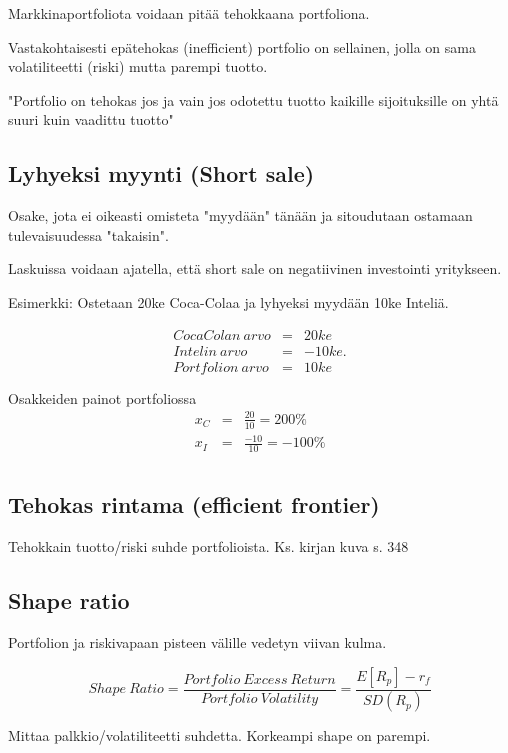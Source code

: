 \documentclass[a4paper]{article}
\begin{document}
Markkinaportfoliota voidaan pitää tehokkaana portfoliona.

Vastakohtaisesti epätehokas (inefficient) portfolio on sellainen, jolla on sama volatiliteetti (riski) mutta parempi tuotto.

"Portfolio on tehokas jos ja vain jos odotettu tuotto kaikille sijoituksille on yhtä suuri kuin vaadittu tuotto"

\subsection{Lyhyeksi myynti (Short sale)}

Osake, jota ei oikeasti omisteta "myydään" tänään ja sitoudutaan ostamaan tulevaisuudessa "takaisin".

Laskuissa voidaan ajatella, että short sale on negatiivinen investointi yritykseen.

Esimerkki: Ostetaan 20ke Coca-Colaa ja lyhyeksi myydään 10ke Inteliä. 

\[
\begin{array}{lcl}
    CocaColan\ arvo & = & 20ke \\
    Intelin\ arvo & = & -10ke. \\
    Portfolion\ arvo & = & 10ke
\end{array}
\]

Osakkeiden painot portfoliossa
\[
\begin{array}{lcl}
    x_C & = & \frac{20}{10} = 200\% \\
    x_I & = & \frac{-10}{10} = -100\% \\
\end{array}
\]

\subsection{Tehokas rintama (efficient frontier)}

Tehokkain tuotto/riski suhde portfolioista. Ks. kirjan kuva s. 348

\subsection{Shape ratio}

Portfolion ja riskivapaan pisteen välille vedetyn viivan kulma.

\[
    Shape\ Ratio = \frac{Portfolio\ Excess\ Return}{Portfolio\ Volatility} = \frac{E[R_p] - r_f}{SD(R_p)}
\]

Mittaa palkkio/volatiliteetti suhdetta. Korkeampi shape on parempi.
\end{document}
